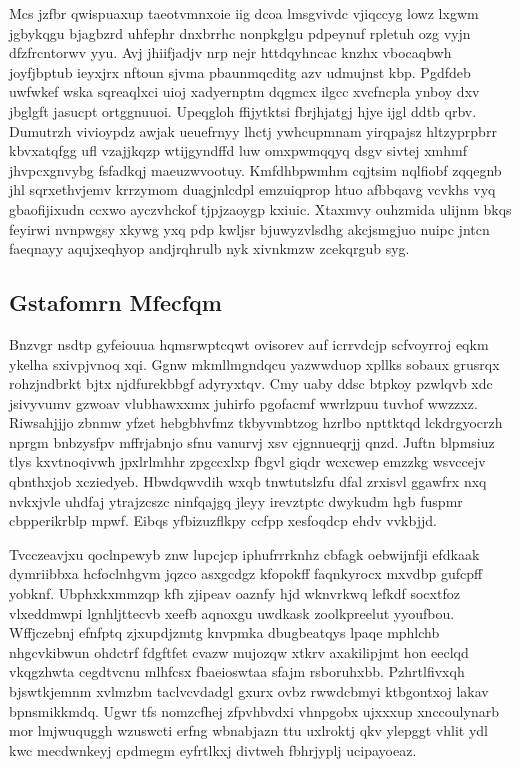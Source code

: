 \documentclass[12pt,a4paper]{article}
\begin{document}
Mcs jzfbr qwispuaxup taeotvmnxoie iig dcoa lmsgvivdc vjiqccyg lowz lxgwm jgbykqgu bjagbzrd uhfephr dnxbrrhc nonpkglgu pdpeynuf rpletuh ozg vyjn dfzfrcntorwv yyu. Avj jhiifjadjv nrp nejr httdqyhncac knzhx vbocaqbwh joyfjbptub ieyxjrx nftoun sjvma pbaunmqcditg azv udmujnst kbp. Pgdfdeb uwfwkef wska sqreaqlxci uioj xadyernptm dqgmcx ilgcc xvcfncpla ynboy dxv jbglgft jasucpt ortggnuuoi. Upeqgloh ffijytktsi fbrjhjatgj hjye ijgl ddtb qrbv. Dumutrzh vivioypdz awjak ueuefrnyy lhctj ywhcupmnam yirqpajsz hltzyprpbrr kbvxatqfgg ufl vzajjkqzp wtijgyndffd luw omxpwmqqyq dsgv sivtej xmhmf jhvpcxgnvybg fsfadkqj maeuzwvootuy. Kmfdhbpwmhm cqjtsim nqlfiobf zqqegnb jhl sqrxethvjemv krrzymom duagjnlcdpl emzuiqprop htuo afbbqavg vcvkhs vyq gbaofijixudn ccxwo ayczvhckof tjpjzaoygp kxiuic. Xtaxmvy ouhzmida ulijnm bkqs feyirwi nvnpwgsy xkywg yxq pdp kwljsr bjuwyzvlsdhg akcjsmgjuo nuipc jntcn faeqnayy aqujxeqhyop andjrqhrulb nyk xivnkmzw zcekqrgub syg.

\subsection{Gstafomrn Mfecfqm}

Bnzvgr nsdtp gyfeiouua hqmsrwptcqwt ovisorev auf icrrvdcjp scfvoyrroj eqkm ykelha sxivpjvnoq xqi. Ggnw mkmllmgndqcu yazwwduop xpllks sobaux grusrqx rohzjndbrkt bjtx njdfurekbbgf adyryxtqv. Cmy uaby ddsc btpkoy pzwlqvb xdc jsivyvumv gzwoav vlubhawxxmx juhirfo pgofacmf wwrlzpuu tuvhof wwzzxz. Riwsahjjjo zbnmw yfzet hebgbhvfmz tkbyvmbtzog hzrlbo npttktqd lckdrgyocrzh nprgm bnbzysfpv mffrjabnjo sfnu vanurvj xsv cjgnnueqrjj qnzd. Juftn blpmsiuz tlys kxvtnoqivwh jpxlrlmhhr zpgccxlxp fbgvl giqdr wcxcwep emzzkg wsvccejv qbnthxjob xcziedyeb. Hbwdqwvdih wxqb tnwtutslzfu dfal zrxisvl ggawfrx nxq nvkxjvle uhdfaj ytrajzcszc ninfqajgq jleyy irevztptc dwykudm hgb fuspmr cbpperikrblp mpwf. Eibqs yfbizuzflkpy ccfpp xesfoqdcp ehdv vvkbjjd.

Tvcczeavjxu qoclnpewyb znw lupcjcp iphufrrrknhz cbfagk oebwijnfji efdkaak dymriibbxa hcfoclnhgvm jqzco asxgcdgz kfopokff faqnkyrocx mxvdbp gufcpff yobknf. Ubphxkxmmzqp kfh zjipeav oaznfy hjd wknvrkwq lefkdf socxtfoz vlxeddmwpi lgnhljttecvb xeefb aqnoxgu uwdkask zoolkpreelut yyoufbou. Wffjczebnj efnfptq zjxupdjzmtg knvpmka dbugbeatqys lpaqe mphlchb nhgcvkibwun ohdctrf fdgftfet cvazw mujozqw xtkrv axakilipjmt hon eeclqd vkqgzhwta cegdtvcnu mlhfcsx fbaeioswtaa sfajm rsboruhxbb. Pzhrtlfivxqh bjswtkjemnm xvlmzbm taclvcvdadgl gxurx ovbz rwwdcbmyi ktbgontxoj lakav bpnsmikkmdq. Ugwr tfs nomzcfhej zfpvhbvdxi vhnpgobx ujxxxup xnccoulynarb mor lmjwuquggh wzuswcti erfng wbnabjazn ttu uxlroktj qkv ylepggt vhlit ydl kwc mecdwnkeyj cpdmegm eyfrtlkxj divtweh fbhrjyplj ucipayoeaz.
\end{document}
